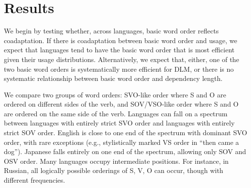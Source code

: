 \documentclass[11pt,a4paper]{article}
\newcommand\mhahn[1]{{\color{red}(#1)}}
\begin{document}















\section*{Results}
We begin by testing whether, across languages, basic word order reflects coadaptation.
If there is coadaptation between basic word order and usage, we expect that languages tend to have the basic word order that is most efficient given their usage distributions.
Alternatively, we expect that, either, one of the two basic word orders is systematically more efficient for DLM, or there is no systematic relationship between basic word order and dependency length.




We compare two groups of word orders: SVO-like order where S and O are ordered on different sides of the verb, and SOV/VSO-like order where S and O are ordered on the same side of the verb.
Languages can fall on a spectrum between languages with entirely strict SVO order and languages with entirely strict SOV order.
English is close to one end of the spectrum with dominant SVO order, with rare exceptions (e.g., stylistically marked VS order in ``then came a dog'').
Japanese falls entirely on one end of the spectrum, allowing only SOV and OSV order.
Many languages occupy intermediate positions. 
For instance, in Russian, all logically possible orderings of S, V, O can occur, though with different frequencies.
\end{document}
